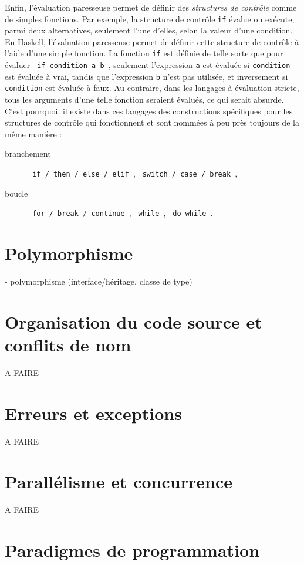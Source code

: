 \documentclass[a4paper,francais]{insalyon}
\begin{document}
Enfin, l'évaluation paresseuse permet de définir des \emph{structures de contrôle} comme de simples fonctions. Par exemple, la structure de contrôle \texttt{if} évalue ou exécute, parmi deux alternatives, seulement l'une d'elles, selon la valeur d'une condition. En Haskell, l'évaluation paresseuse permet de définir cette structure de contrôle à l'aide d'une simple fonction. La fonction \texttt{if} est définie de telle sorte que pour évaluer \verb! if condition a b !, seulement l'expression \texttt{a} est évaluée si \texttt{condition} est évaluée à vrai, tandis que l'expression \texttt{b} n'est pas utilisée, et inversement si \texttt{condition} est évaluée à faux. Au contraire, dans les langages à évaluation stricte, tous les arguments d'une telle fonction seraient évalués, ce qui serait absurde. C'est pourquoi, il existe dans ces langages des constructions spécifiques pour les structures de contrôle qui fonctionnent et sont nommées à peu près toujours de la même manière :
\begin{description}
\item[branchement] \verb! if / then / else / elif !, \verb! switch / case / break !, 
\item[boucle] \verb! for / break / continue !, \verb! while !, \verb! do while !.
\end{description}

\section{Polymorphisme}

- polymorphisme (interface/héritage, classe de type)

\section{Organisation du code source et conflits de nom}

A FAIRE

\section{Erreurs et exceptions}

A FAIRE

\section{Parallélisme et concurrence}

A FAIRE

\section{Paradigmes de programmation}
\end{document}
